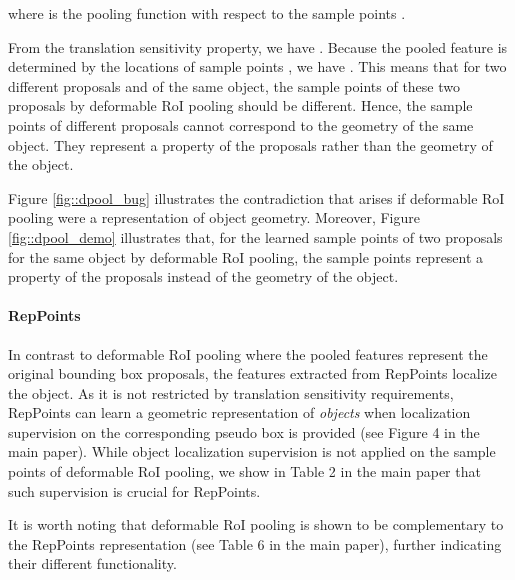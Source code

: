 \documentclass[10pt,twocolumn,letterpaper]{article}
\begin{document}
where  is the pooling function with respect to the sample points . 

From the translation sensitivity property, we have . Because the pooled feature  is determined by the locations of sample points , we have . This means that for two different proposals  and  of the same object, the sample points of these two proposals by deformable RoI pooling should be different. Hence, the sample points of different proposals cannot correspond to the geometry of the same object. They represent a property of the proposals rather than the geometry of the object.

Figure \ref{fig::dpool_bug} illustrates the contradiction that arises if deformable RoI pooling were a representation of object geometry. Moreover, Figure \ref{fig::dpool_demo} illustrates that, for the learned sample points of two proposals for the same object by deformable RoI pooling, the sample points represent a property of the proposals instead of the geometry of the object. 

\paragraph{RepPoints}
In contrast to deformable RoI pooling where the pooled features represent the original bounding box proposals, the features extracted from RepPoints localize the object. As it is not restricted by translation sensitivity requirements, RepPoints can learn a geometric representation of \emph{objects} when localization supervision on the corresponding pseudo box is provided (see Figure 4 in the main paper). While object localization supervision is not applied on the sample points of deformable RoI pooling, we show in Table 2 in the main paper that such supervision is crucial for RepPoints.


It is worth noting that deformable RoI pooling \cite{DCN} is shown to be complementary to the RepPoints representation (see Table 6 in the main paper), further indicating their different functionality.
\end{document}
